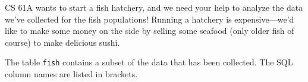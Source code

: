 CS 61A wants to start a fish hatchery, and we need your help to analyze the data we've collected for the fish populations! Running a hatchery is expensive---we'd like to make some money on the side by selling some seafood (only older fish of course) to make delicious sushi. 

The table \lstinline{fish} contains a subset of the data that has been collected. The SQL column names are listed in brackets. 
